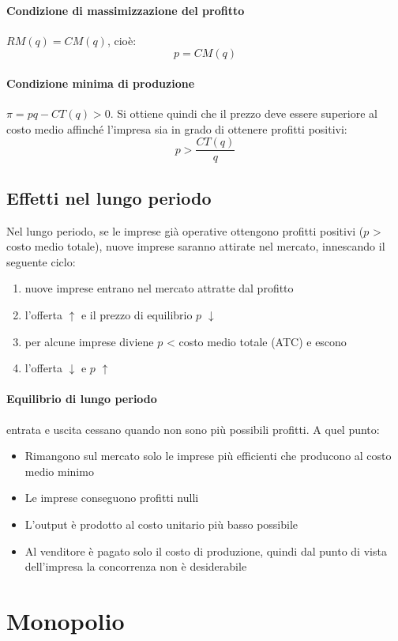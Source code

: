 \paragraph{Condizione di massimizzazione del profitto} $RM(q) = CM(q)$, cioè:
\[
p = CM(q)
\]

\paragraph{Condizione minima di produzione} $\pi = pq - CT(q) > 0$. Si ottiene quindi che il prezzo deve essere superiore al costo medio affinché l’impresa sia in grado
di ottenere profitti positivi:
\[
p > \frac{CT(q)}{q}
\]

\subsection{Effetti nel lungo periodo}
Nel lungo periodo, se le imprese già operative ottengono profitti positivi ($p$ > costo medio totale), nuove
imprese saranno attirate nel mercato, innescando il seguente ciclo:
\begin{enumerate}
	\item nuove imprese entrano nel mercato attratte dal profitto
	\item l’offerta $\uparrow$­ e il prezzo di equilibrio $p$ $\downarrow$
	\item per alcune imprese diviene $p$ < costo medio totale (ATC)
e escono
	\item l’offerta $\downarrow$ e $p$ $\uparrow$ 
\end{enumerate}

\paragraph{Equilibrio di lungo periodo} entrata e uscita cessano quando non sono più possibili profitti. A quel punto:
\begin{itemize}
	\item Rimangono sul mercato solo le imprese più efficienti che producono al costo medio minimo
	\item Le imprese conseguono profitti nulli
	\item L’output è prodotto al costo unitario più basso possibile
	\item Al venditore è pagato solo il costo di produzione, quindi dal punto di vista dell’impresa la concorrenza
	non è desiderabile
\end{itemize}

\section{Monopolio}

